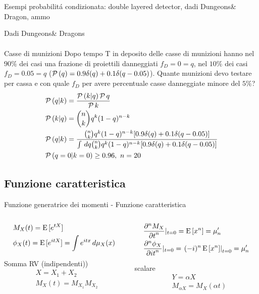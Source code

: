 \begin{frame}[allowframebreaks]{Esempi probabilit\'a condizionata: double layered detector, dadi Dungeons\& Dragon, ammo}
\begin{block}{Dadi Dungeons\& Dragons}
\begin{align*}
\end{align*}
\end{block}
\begin{block}{Casse di munizioni}
Dopo tempo T in deposito delle casse di munizioni hanno nel $90\%$ dei casi una frazione di proiettili danneggiati $f_D=0=q$, nel $10\%$ dei casi $f_D=0.05=q$ ($\prob{(q)}=0.9\delta(q)+0.1\delta(q-0.05)$). Quante munizioni devo testare per cassa e con quale $f_D$ per avere percentuale casse danneggiate minore del $5\%$?
\begin{align*}
&\prob{(q|k)}=\frac{\prob{(k|q)}\prob{q}}{\prob{k}}\\
&\prob{(k|q)}=\binom{n}{k}q^k(1-q)^{n-k}\\
&\prob{(q|k)}=\frac{\binom{n}{k}q^k(1-q)^{n-k}[0.9\delta(q)+0.1\delta(q-0.05)]}{\int\,dq\binom{n}{k}q^k(1-q)^{n-k}[0.9\delta(q)+0.1\delta(q-0.05)]}\\
&\prob{(q=0|k=0)}\geq0.96,\ n=20
\end{align*}
\end{block}
\end{frame}

\subsection{Funzione caratteristica}

\begin{frame}{Funzione generatrice dei momenti - Funzione caratteristica}
\begin{columns}[T]
\begin{column}{0.5\textwidth}
\begin{align*}
&M_X(t)=\E{[\exp{tX}]}\\
&\phi_X(t)=\E{[\exp{itX}]}=\int\exp{itx}\,d\mu_X(x)
\end{align*}
\begin{block}{Somma RV (indipendenti))}
\begin{align*}
&X=X_1+X_2\\
&M_X(t)=M_{X_1}M_{X_2}
\end{align*}
\end{block}
\end{column}
\begin{column}{0.5\textwidth}
\begin{align*}
&\PDyn{t}{M_X}{n}|_{t=0}=\E{[x^n]}=\mu_n'\\
&\PDyn{it}{\phi_X}{n}|_{t=0}=\left.(-i)^n\E{[x^n]}\right|_{t=0}=\mu_n'
\end{align*}
\begin{block}{scalare}
\begin{align*}
&Y=\alpha X\\
&M_{\alpha X}=M_X(\alpha t)
\end{align*}
\end{block}
\end{column}
\end{columns}
\end{frame}

